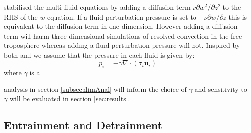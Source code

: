 \documentclass[draft]{agujournal2019}
\begin{document}
\subsubsection{}

 stabilised the multi-fluid equations by adding a diffusion
term $\nu\partial w^{2}/\partial z^{2}$ to the RHS of the $w$ equation.
If a fluid perturbation pressure is set to $-\nu\partial w/\partial z$
this is equivalent to the diffusion term in one dimension. However
adding a diffusion term will harm three dimensional simulations of
resolved convection in the free troposphere whereas adding a fluid
perturbation pressure will not. Inspired by both  and
 we assume that the pressure in each fluid is given
by:
\begin{equation}
p_{i}=-\gamma\nabla\cdot(\sigma_i \mathbf{u}_{i})
\label{eq:Pi_div}
\end{equation}
where $\gamma$ is a 

 analysis in section
\ref{subsec:dimAnal} will inform the choice of $\gamma$ and sensitivity
to $\gamma$ will be evaluated in section \ref{sec:results}.

\subsection{Entrainment and Detrainment \label{subsec:Sij}}
\end{document}
